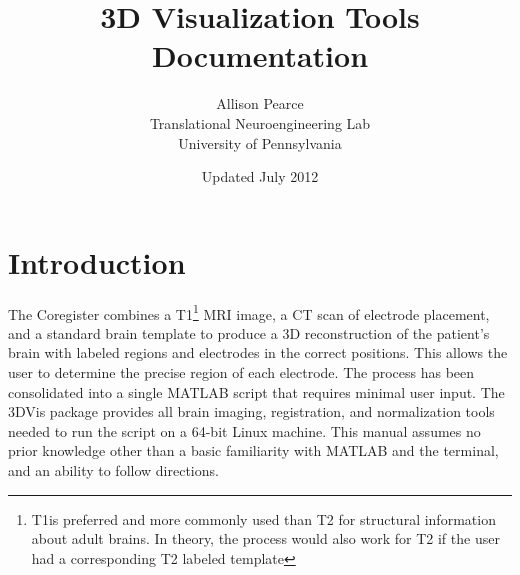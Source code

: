 \documentclass[12pt]{article}
\title{3D Visualization Tools Documentation}
\author{Allison Pearce\\Translational Neuroengineering Lab\\University of Pennsylvania}
\date{Updated July 2012}
\begin{document}
\maketitle



\renewcommand{\cftsecleader}{\cftdotfill{\cftdotsep}}
\tableofcontents


\newpage
{}
\section{Introduction}
The Coregister combines a T1\footnote{T1is preferred and more commonly used than T2 for structural information about adult brains. In theory, the process would also work for T2 if the user had a corresponding T2 labeled template} MRI image, a CT scan of electrode placement, and a standard brain template to produce a 3D reconstruction of the patient's brain with labeled regions and electrodes in the correct positions. This allows the user to determine the precise region of each electrode. The process has been consolidated into a single MATLAB script that requires minimal user input. The 3DVis package provides all brain imaging, registration, and normalization tools needed to run the script on a 64-bit Linux machine. This manual assumes no prior knowledge other than a basic familiarity with MATLAB and the terminal, and an ability to follow directions.
\end{document}
